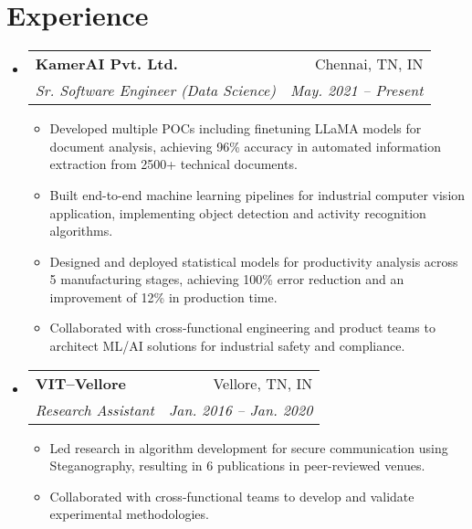 \documentclass[a4paper,11pt]{article}
\makeatletter
\newcommand{\resumeSubheading}[4]{
  \vspace{-1pt}\item
    \begin{tabular*}{0.97\textwidth}[t]{l@{\extracolsep{\fill}}r}
      \textbf{#1} & #2 \\
      \textit{\small#3} & \textit{\small #4} \\
    \end{tabular*}\vspace{-5pt}
}
\newcommand{\resumeSubHeadingListStart}{\begin{itemize}[leftmargin=*]}
\newcommand{\resumeSubHeadingListEnd}{\end{itemize}}
\makeatother
\begin{document}
\section{Experience}
  \resumeSubHeadingListStart
    \resumeSubheading
      {KamerAI Pvt. Ltd.}{Chennai, TN, IN}
      {Sr. Software Engineer (Data Science)}{May. 2021 -- Present}
      \begin{itemize}[leftmargin=*, itemsep = -2pt]
      \item {Developed multiple POCs including finetuning LLaMA models for document analysis, achieving 96\% accuracy in automated information extraction from 2500+ technical documents.}
      \item {Built end-to-end machine learning pipelines for industrial computer vision application, implementing object detection and activity recognition algorithms.}
      \item {Designed and deployed statistical models for productivity analysis across 5 manufacturing stages, achieving 100\% error reduction and an improvement of 12\% in production time.}
      \item {Collaborated with cross-functional engineering and product teams to architect ML/AI solutions for industrial safety and compliance.}
      \end{itemize}
    \resumeSubheading
      {VIT--Vellore}{Vellore, TN, IN}
      {Research Assistant}{Jan. 2016 -- Jan. 2020}
      \begin{itemize}[leftmargin=*, itemsep = -2pt]
        \item {Led research in algorithm development for secure communication using Steganography, resulting in 6 publications in peer-reviewed venues.}
        \item {Collaborated with cross-functional teams to develop and validate experimental methodologies.}
      \end{itemize}
  \resumeSubHeadingListEnd

\end{document}
